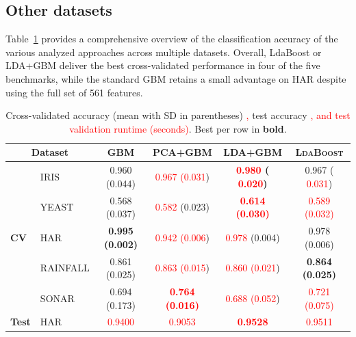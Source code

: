 \documentclass[11pt,a4paper]{article}
\providecommand{\DIFaddtex}[1]{\textcolor{red}{#1}}
\providecommand{\DIFaddend}{}
\providecommand{\DIFadd}[1]{\texorpdfstring{\DIFaddtex{#1}}{#1}}
\providecommand{\DIFaddbeginFL}{}
\providecommand{\DIFaddendFL}{}
\providecommand{\DIFaddFL}[1]{\DIFadd{#1}}
\begin{document}
\DIFaddend \subsection*{Other datasets}

Table~\ref{tab:classification_results} provides a comprehensive overview of the classification accuracy of the various analyzed approaches across multiple datasets. Overall, LdaBoost or LDA+GBM deliver the best cross-validated performance in four of the five benchmarks, while the standard GBM retains a small advantage on HAR despite using the full set of 561 features.


\begin{table}[h!]
\centering
\begingroup
\setlength{\tabcolsep}{5pt}
\renewcommand{\arraystretch}{1.0}
\footnotesize
\caption{Cross-validated accuracy (mean with SD in parentheses) \DIFaddbeginFL \DIFaddFL{, }\DIFaddendFL test accuracy \DIFaddbeginFL \DIFaddFL{, and test validation runtime (seconds)}\DIFaddendFL .
Best per row in \textbf{bold}.}
\label{tab:classification_results}
\begin{tabular}{@{}llcccc@{}}
\toprule
\multicolumn{2}{c}{\textbf{Dataset}} & \textbf{GBM} & \textbf{PCA+GBM} & \textbf{LDA+GBM} & \textbf{\textsc{LdaBoost}} \\
\midrule
\multirow{5}{*}{\textbf{CV}} 
    & IRIS      & 0.960 (0.044) &  \DIFaddbeginFL \DIFaddFL{0.967 (0.031}\DIFaddendFL ) & \textbf{ \DIFaddbeginFL \DIFaddFL{0.980 }\DIFaddendFL ( \DIFaddbeginFL \DIFaddFL{0.020}\DIFaddendFL )} & 0.967 ( \DIFaddbeginFL \DIFaddFL{0.031}\DIFaddendFL ) \\
    & YEAST     & 0.568 (0.037) &  \DIFaddbeginFL \DIFaddFL{0.582 }\DIFaddendFL (0.023) &  \DIFaddbeginFL \DIFaddFL{\textbf{0.614 (0.030)} }\DIFaddendFL &  \DIFaddbeginFL \DIFaddFL{0.589 (0.032) }\DIFaddendFL \\
    & HAR       & \textbf{0.995 (0.002)} &  \DIFaddbeginFL \DIFaddFL{0.942 (0.006}\DIFaddendFL ) &  \DIFaddbeginFL \DIFaddFL{0.978 }\DIFaddendFL (0.004) & 0.978 (0.006) \\
    & RAINFALL  & 0.861 (0.025) &  \DIFaddbeginFL \DIFaddFL{0.863 (0.015}\DIFaddendFL ) &  \DIFaddbeginFL \DIFaddFL{0.860 (0.021}\DIFaddendFL ) & \textbf{0.864 (0.025)} \\
    & SONAR     & 0.694 (0.173) &  \DIFaddbeginFL \DIFaddFL{\textbf{0.764 (0.016)} }& \DIFaddFL{0.688 (0.052}\DIFaddendFL ) &  \DIFaddbeginFL \DIFaddFL{0.721 (0.075) }\DIFaddendFL \\
\midrule
\multirow{2}{*}{\textbf{Test}} 
    & HAR       &  \DIFaddbeginFL \DIFaddFL{0.9400 }\DIFaddendFL &  \DIFaddbeginFL \DIFaddFL{0.9053 }\DIFaddendFL & \textbf{ \DIFaddbeginFL \DIFaddFL{0.9528}\DIFaddendFL } &  \DIFaddbeginFL \DIFaddFL{0.9511 }\DIFaddendFL \\

\end{tabular}
\end{table}
\end{document}
